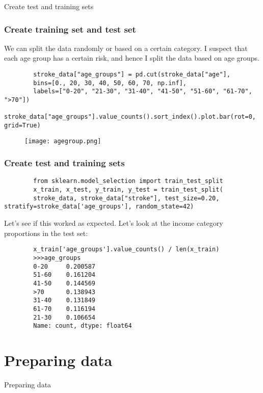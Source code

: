 \documentclass[10pt]{beamer}
\theoremstyle{definition}
\theoremstyle{remark}
\numberwithin{equation}{section}
\begin{document}
\begin{frame}
	\centering Create test and training sets
\end{frame}
\begingroup
\footnotesize
\begin{frame}[fragile]
	\frametitle{Create training set and test set}
	We can split the data randomly or based on a certain category. I suspect that each age group has a certain risk, and hence I split the data based on age groups.
	\begin{lstlisting}
		stroke_data["age_groups"] = pd.cut(stroke_data["age"],
		bins=[0., 20, 30, 40, 50, 60, 70, np.inf],
		labels=["0-20", "21-30", "31-40", "41-50", "51-60", "61-70", ">70"])
		stroke_data["age_groups"].value_counts().sort_index().plot.bar(rot=0, grid=True)
	\end{lstlisting}
	
	\begin{figure}[h]
		\texttt{[image: agegroup.png]}
	\end{figure}
\end{frame}
\endgroup 


\begin{frame}[fragile]
	\frametitle{Create test and training sets}
	
	\begin{lstlisting}
		from sklearn.model_selection import train_test_split
		x_train, x_test, y_train, y_test = train_test_split(
		stroke_data, stroke_data["stroke"], test_size=0.20, stratify=stroke_data['age_groups'], random_state=42)
	\end{lstlisting}
	
	Let’s see if this worked as expected. Let's look at the income
	category proportions in the test set:
	
	\begin{lstlisting}
		x_train['age_groups'].value_counts() / len(x_train)
		>>>age_groups
		0-20     0.200587
		51-60    0.161204
		41-50    0.144569
		>70      0.138943
		31-40    0.131849
		61-70    0.116194
		21-30    0.106654
		Name: count, dtype: float64
	\end{lstlisting}
\end{frame}

\section{Preparing data}

\begin{frame}
	\centering Preparing data
\end{frame}
\end{document}
